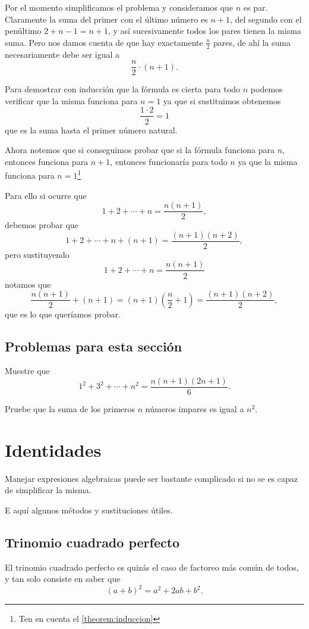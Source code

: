 Por el momento simplificamos el problema
y consideramos que $n$ es par. Claramente
la suma del primer con el último
número es $n + 1$,
del segundo con el penúltimo $2 + n - 1 = n + 1$,
y así sucesivamente todos los pares tienen la
misma suma. Pero nos damos cuenta de que
hay exactamente $\frac n2$ pares, de ahí la suma
necesariamente debe ser igual a
\[\frac n2 \cdot (n + 1).\]

Para demostrar con inducción que la fórmula
es cierta para todo $n$
podemos verificar que la misma funciona
para $n = 1$ ya que si sustituimos obtenemos
\[\frac{1 \cdot 2}{2} = 1\]
que es la suma hasta el primer número natural.

Ahora notemos que si conseguimos probar que
si la fórmula funciona para $n$, entonces
funciona para $n + 1$, entonces funcionaría
para todo $n$ ya que la misma funciona para
$n = 1$\footnote{Ten en cuenta el \autoref{theorem:induccion}}

Para ello si ocurre que
\[1 + 2 + \cdots + n = \frac{n(n + 1)}2,\]
debemos probar que
\[1 + 2 + \cdots + n + (n + 1) = \frac{(n + 1)(n + 2)}2,\]
pero sustituyendo
\[1 + 2 + \cdots + n = \frac{n(n + 1)}2\]
notamos que
\[\frac{n(n + 1)}2 + (n + 1) = (n + 1)\left(\frac n2 + 1\right) = \frac{(n + 1)(n + 2)}2,\]
que es lo que queríamos probar.

\subsection*{Problemas para esta sección}
\begin{problem}
Muestre que
\[1^2 + 3^2 + \cdots + n^2 = \frac{n(n + 1)(2n + 1)}6.\]
\end{problem}

\begin{problem}
Pruebe que la suma de los primeros
$n$ números impares es igual a $n^2$.
\end{problem}

\section{Identidades}
Manejar expresiones algebraicas puede ser
bastante complicado si no se es capaz
de simplificar la misma.

E aquí algunos métodos y sustituciones
útiles.

\subsection{Trinomio cuadrado perfecto}
El trinomio cuadrado perfecto es quizás
el caso de factoreo más común de todos,
y tan solo consiste en saber que
\[(a + b)^2 = a^2 + 2ab + b^2.\]

